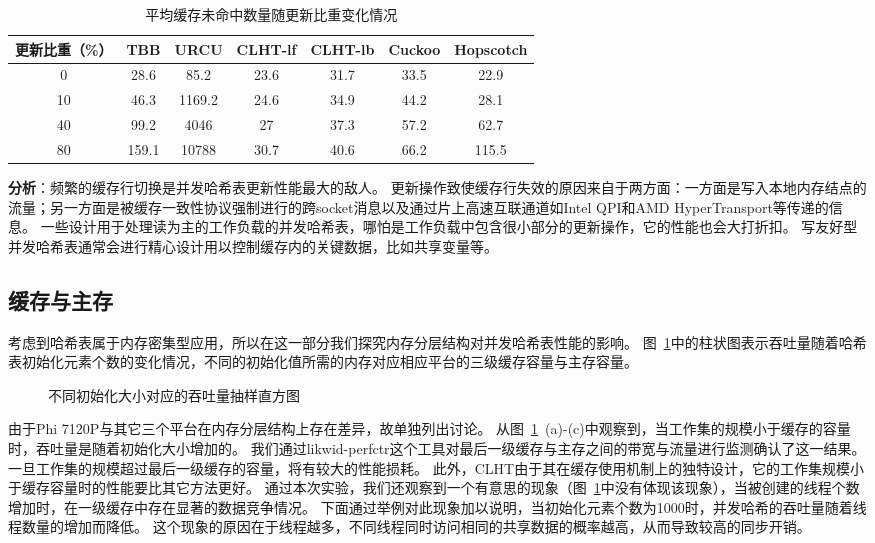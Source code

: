 \begin{table}[htbp]
  \centering
  \caption{平均缓存未命中数量随更新比重变化情况}
  \label{tab:cache_misses_update}
  \begin{tabular}{ccccccc}
    \toprule
       更新比重（\%） & TBB & URCU & CLHT-lf & CLHT-lb & Cuckoo & Hopscotch  \\
    \midrule
     0 & 28.6 & 85.2 & 23.6 & 31.7 & 33.5 & 22.9  \\
      10 & 46.3 & 1169.2 & 24.6 & 34.9 & 44.2 & 28.1 \\
      40 & 99.2 & 4046 & 27 & 37.3 & 57.2 & 62.7 \\
      80 & 159.1 & 10788 & 30.7 & 40.6 & 66.2 & 115.5  \\
    \bottomrule
  \end{tabular}
\end{table}

\textbf{分析}：频繁的缓存行切换是并发哈希表更新性能最大的敌人。
更新操作致使缓存行失效的原因来自于两方面：一方面是写入本地内存结点的流量；另一方面是被缓存一致性协议强制进行的跨socket消息以及通过片上高速互联通道如Intel QPI和AMD HyperTransport等传递的信息。
一些设计用于处理读为主的工作负载的并发哈希表，哪怕是工作负载中包含很小部分的更新操作，它的性能也会大打折扣。
写友好型并发哈希表通常会进行精心设计用以控制缓存内的关键数据，比如共享变量等。

\subsection{缓存与主存}
考虑到哈希表属于内存密集型应用，所以在这一部分我们探究内存分层结构对并发哈希表性能的影响。
图~\ref{fig:initial_size}中的柱状图表示吞吐量随着哈希表初始化元素个数的变化情况，不同的初始化值所需的内存对应相应平台的三级缓存容量与主存容量。

\begin{figure}[htbp]
\centering
\caption{不同初始化大小对应的吞吐量抽样直方图}
\label{fig:initial_size}
\end{figure}

由于Phi 7120P与其它三个平台在内存分层结构上存在差异，故单独列出讨论。
从图~\ref{fig:initial_size}~(a)-(c)中观察到，当工作集的规模小于缓存的容量时，吞吐量是随着初始化大小增加的。
我们通过likwid-perfctr这个工具对最后一级缓存与主存之间的带宽与流量进行监测确认了这一结果。
一旦工作集的规模超过最后一级缓存的容量，将有较大的性能损耗。
此外，CLHT由于其在缓存使用机制上的独特设计，它的工作集规模小于缓存容量时的性能要比其它方法更好。
通过本次实验，我们还观察到一个有意思的现象（图~\ref{fig:initial_size}中没有体现该现象），当被创建的线程个数增加时，在一级缓存中存在显著的数据竞争情况。
下面通过举例对此现象加以说明，当初始化元素个数为1000时，并发哈希的吞吐量随着线程数量的增加而降低。
这个现象的原因在于线程越多，不同线程同时访问相同的共享数据的概率越高，从而导致较高的同步开销。


